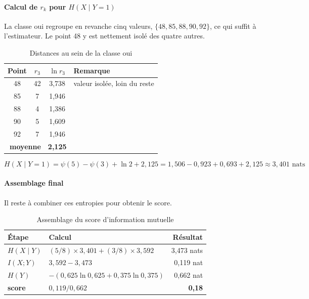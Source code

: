 \paragraph{Calcul de $r_k$ pour $H(X \mid Y{=}1)$}

La classe \og oui \fg{} regroupe en revanche cinq valeurs, $\{48, 85, 88, 90, 92\}$, ce qui suffit à l'estimateur. Le point 48 y est nettement isolé des quatre autres.

\begin{table}[H]
    \centering
    \label{tab:mi-rk-classe1}
    \begin{tabular}{|c|c|c|l|}
        \hline
        \textbf{Point} & $r_3$ & $\ln r_3$ & \textbf{Remarque} \\
        \hline
        48 & 42 & 3,738 & valeur isolée, loin du reste \\
        \hline
        85 & 7 & 1,946 & \\
        \hline
        88 & 4 & 1,386 & \\
        \hline
        90 & 5 & 1,609 & \\
        \hline
        92 & 7 & 1,946 & \\
        \hline
        \multicolumn{2}{|r|}{\textbf{moyenne}} & \textbf{2,125} & \\
        \hline
    \end{tabular}
    \caption{Distances au sein de la classe \og oui \fg}

\end{table}

\[
H(X \mid Y{=}1) = \psi(5) - \psi(3) + \ln 2 + 2{,}125 = 1{,}506 - 0{,}923 + 0{,}693 + 2{,}125 \approx 3{,}401 \text{ nats}
\]

\paragraph{Assemblage final}

Il reste à combiner ces entropies pour obtenir le score.

\begin{table}[H]
    \centering
    \label{tab:mi-assemblage}
    \begin{tabular}{|l|l|r|}
        \hline
        \textbf{Étape} & \textbf{Calcul} & \textbf{Résultat} \\
        \hline
        $H(X \mid Y)$ & $(5/8) \times 3{,}401 + (3/8) \times 3{,}592$ & 3,473 nats \\
        \hline
        $I(X;Y)$ & $3{,}592 - 3{,}473$ & 0,119 nat \\
        \hline
        $H(Y)$ & $-(0{,}625 \ln 0{,}625 + 0{,}375 \ln 0{,}375)$ & 0,662 nat \\
        \hline
        \textbf{score} & $0{,}119 / 0{,}662$ & \textbf{0,18} \\
        \hline
    \end{tabular}
    \caption{Assemblage du score d'information mutuelle}

\end{table}

